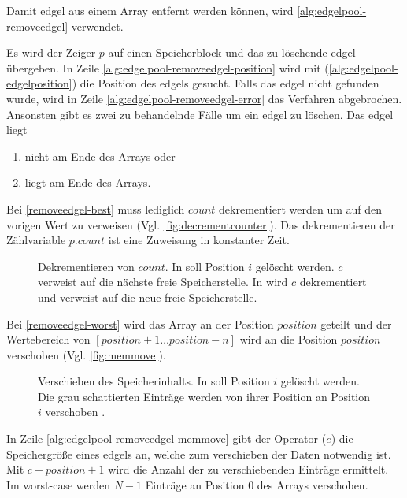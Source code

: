 Damit \gls{edgel} aus einem Array entfernt werden können, wird \autoref{alg:edgelpool-removeedgel} verwendet.

Es wird der Zeiger $p$ auf einen Speicherblock und das zu löschende \gls{edgel} übergeben. In Zeile
 \ref{alg:edgelpool-removeedgel-position} wird mit  (\autoref{alg:edgelpool-edgelposition}) die
 Position des \glspl{edgel} gesucht. Falls das \gls{edgel} nicht gefunden wurde, wird in Zeile
 \ref{alg:edgelpool-removeedgel-error} das Verfahren abgebrochen. Ansonsten gibt es zwei zu behandelnde Fälle um ein
 \gls{edgel} zu löschen. Das \gls{edgel} liegt
\begin{enumerate}
	\item nicht am Ende des Arrays oder \label{removeedgel-worst}
	\item liegt am Ende des Arrays. \label{removeedgel-best}
\end{enumerate}
Bei \autoref{removeedgel-best} muss lediglich $\mathit{count}$ dekrementiert werden um auf den vorigen Wert zu
 verweisen (Vgl. \autoref{fig:decrementcounter}). Das dekrementieren der Zählvariable $\mathit{p.count}$ ist eine
 Zuweisung in konstanter Zeit.
\begin{figure}[!ht]
	\centering
	\subfigure[]{
		
		\label{fig:decrementcounter-before}
	}
	\subfigure[]{
		
		\label{fig:decrementcounter-after}
	}
	\caption{Dekrementieren von $\mathit{count}$. In  soll Position $i$ gelöscht
	 werden. $c$ verweist auf die nächste freie Speicherstelle. In  wird $c$
	 dekrementiert und verweist auf die neue freie Speicherstelle.}
	\label{fig:decrementcounter}
\end{figure}
Bei \autoref{removeedgel-worst} wird das Array an der Position $\mathit{position}$ geteilt und der Wertebereich von
 $[\mathit{position}+1 \dotsc \mathit{position}-n]$ wird an die Position $\mathit{position}$ verschoben
 (Vgl. \autoref{fig:memmove}).
\begin{figure}[!ht]
	\centering
	\subfigure[]{
		
		\label{fig:memmove-before}
	}
	\subfigure[]{
		
		\label{fig:memmove-after}
	}
	\caption{Verschieben des Speicherinhalts. In  soll Position $i$ gelöscht werden. Die
	 grau schattierten Einträge werden von ihrer Position an Position $i$ verschoben .}
	\label{fig:memmove}
\end{figure}
In Zeile \ref{alg:edgelpool-removeedgel-memmove} gibt der Operator ($e$) die Speichergröße eines
 \glspl{edgel} an, welche zum verschieben der Daten notwendig ist. Mit $c - \mathit{position} + 1$ wird die Anzahl der
 zu verschiebenden Einträge ermittelt. Im worst-case werden $N-1$ Einträge an Position $0$ des Arrays verschoben.

